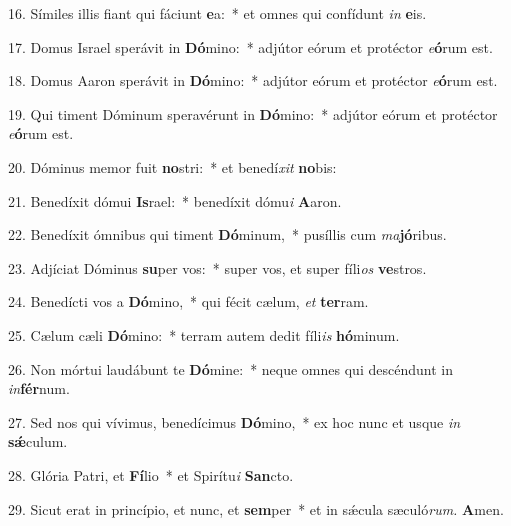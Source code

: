 \item 16. Símiles illis fiant qui fáciunt \textbf{e}a:~* et omnes qui confídunt \textit{in} \textbf{e}is.

\item 17. Domus Israel sperávit in \textbf{Dó}mino:~* adjútor eórum et protéctor \textit{e}\textbf{ó}rum est.

\item 18. Domus Aaron sperávit in \textbf{Dó}mino:~* adjútor eórum et protéctor \textit{e}\textbf{ó}rum est.

\item 19. Qui timent Dóminum speravérunt in \textbf{Dó}mino:~* adjútor eórum et protéctor \textit{e}\textbf{ó}rum est.

\item 20. Dóminus memor fuit \textbf{no}stri:~* et benedí\hspace{0.03em}\textit{xit} \textbf{no}bis:

\item 21. Benedíxit dómui \textbf{Is}rael:~* benedíxit dómu\textit{i} \textbf{A}aron.

\item 22. Benedíxit ómnibus qui timent \textbf{Dó}minum,~* pusíllis cum \textit{ma}\textbf{jó}ribus.

\item 23. Adjíciat Dóminus \textbf{su}per vos:~* super vos, et super fíli\textit{os} \textbf{ve}stros.

\item 24. Benedícti vos a \textbf{Dó}mino,~* qui fécit cælum, \textit{et} \textbf{ter}ram.

\item 25. Cælum cæli \textbf{Dó}mino:~* terram autem dedit fíli\textit{is} \textbf{hó}minum.

\item 26. Non mórtui laudábunt te \textbf{Dó}mine:~* neque omnes qui descéndunt in \textit{in}\textbf{fér}num.

\item 27. Sed nos qui vívimus, benedícimus \textbf{Dó}mino,~* ex hoc nunc et usque \textit{in} \textbf{sǽ}culum.

\item 28. Glória Patri, et \textbf{Fí}lio~* et Spirítu\textit{i} \textbf{San}cto.

\item 29. Sicut erat in princípio, et nunc, et \textbf{sem}per~* et in sǽcula sæculó\textit{rum.} \textbf{A}men.
